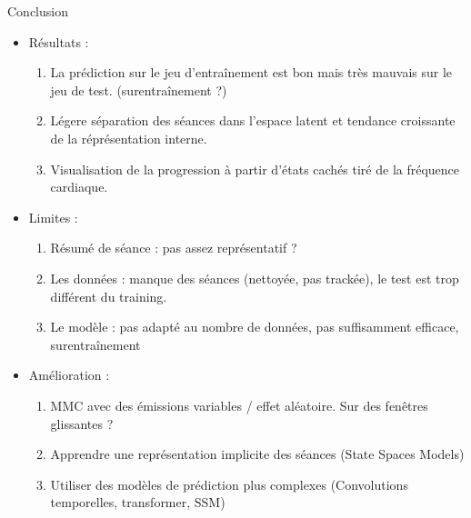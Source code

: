 \documentclass{beamer}
\begin{document}
\begin{frame}{Conclusion}


    \begin{itemize}
        \item Résultats :
        \begin{enumerate}
            \item La prédiction sur le jeu d'entraînement est bon mais très mauvais sur le jeu de test. (surentraînement ?)
            \item Légere séparation des séances dans l'espace latent et tendance croissante de la réprésentation interne.
            \item Visualisation de la progression à partir d'états cachés tiré de la fréquence cardiaque.
        \end{enumerate}
        \item Limites :\begin{enumerate}
            \item Résumé de séance : pas assez représentatif ?
            \item Les données : manque des séances (nettoyée, pas trackée), le test est trop différent du training.
            \item Le modèle : pas adapté au nombre de données, pas suffisamment efficace, surentraînement
        \end{enumerate}
        \item Amélioration : 
        \begin{enumerate}
            \item MMC avec des émissions variables / effet aléatoire. Sur des fenêtres glissantes ?
            \item Apprendre une représentation implicite des séances (State Spaces Models)
            \item Utiliser des modèles de prédiction plus complexes (Convolutions temporelles, transformer, SSM)
        \end{enumerate} 
        
    \end{itemize}
\end{frame}
\end{document}
